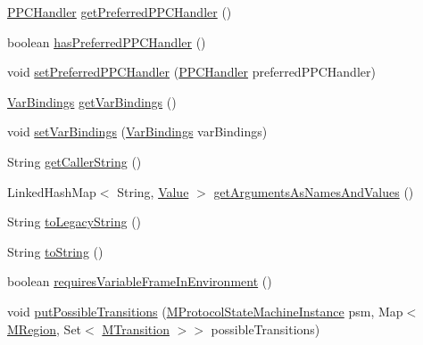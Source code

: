 \begin{DoxyCompactItemize}
\item 
\hyperlink{interfaceorg_1_1tzi_1_1use_1_1uml_1_1sys_1_1ppc_handling_1_1_p_p_c_handler}{P\-P\-C\-Handler} \hyperlink{classorg_1_1tzi_1_1use_1_1uml_1_1sys_1_1_m_operation_call_acb00ad9f70bfbcaa434fc0ba7a3dc27b}{get\-Preferred\-P\-P\-C\-Handler} ()
\item 
boolean \hyperlink{classorg_1_1tzi_1_1use_1_1uml_1_1sys_1_1_m_operation_call_a9b5efe685946efb65226b47e97217d19}{has\-Preferred\-P\-P\-C\-Handler} ()
\item 
void \hyperlink{classorg_1_1tzi_1_1use_1_1uml_1_1sys_1_1_m_operation_call_aa17641a226befd554b35fb9954f46e6d}{set\-Preferred\-P\-P\-C\-Handler} (\hyperlink{interfaceorg_1_1tzi_1_1use_1_1uml_1_1sys_1_1ppc_handling_1_1_p_p_c_handler}{P\-P\-C\-Handler} preferred\-P\-P\-C\-Handler)
\item 
\hyperlink{classorg_1_1tzi_1_1use_1_1uml_1_1ocl_1_1value_1_1_var_bindings}{Var\-Bindings} \hyperlink{classorg_1_1tzi_1_1use_1_1uml_1_1sys_1_1_m_operation_call_a4a476bcb72e8eb4edb392d00eeb30894}{get\-Var\-Bindings} ()
\item 
void \hyperlink{classorg_1_1tzi_1_1use_1_1uml_1_1sys_1_1_m_operation_call_aa7c73345378ff6b84b7cbd7b1a4463ee}{set\-Var\-Bindings} (\hyperlink{classorg_1_1tzi_1_1use_1_1uml_1_1ocl_1_1value_1_1_var_bindings}{Var\-Bindings} var\-Bindings)
\item 
String \hyperlink{classorg_1_1tzi_1_1use_1_1uml_1_1sys_1_1_m_operation_call_af242c567f51c67fc90e03135195b2ec8}{get\-Caller\-String} ()
\item 
Linked\-Hash\-Map$<$ String, \hyperlink{classorg_1_1tzi_1_1use_1_1uml_1_1ocl_1_1value_1_1_value}{Value} $>$ \hyperlink{classorg_1_1tzi_1_1use_1_1uml_1_1sys_1_1_m_operation_call_a762fabe38944988dbb77d1fc52ecba11}{get\-Arguments\-As\-Names\-And\-Values} ()
\item 
String \hyperlink{classorg_1_1tzi_1_1use_1_1uml_1_1sys_1_1_m_operation_call_a53444115bee129e300bea022423c1550}{to\-Legacy\-String} ()
\item 
String \hyperlink{classorg_1_1tzi_1_1use_1_1uml_1_1sys_1_1_m_operation_call_a886568ee3bc7ce5ffd26d778b9bd5db1}{to\-String} ()
\item 
boolean \hyperlink{classorg_1_1tzi_1_1use_1_1uml_1_1sys_1_1_m_operation_call_a87afda00d935c1c491c987b105097a0f}{requires\-Variable\-Frame\-In\-Environment} ()
\item 
void \hyperlink{classorg_1_1tzi_1_1use_1_1uml_1_1sys_1_1_m_operation_call_af09a9c347c2c51d5a88cf222c277da92}{put\-Possible\-Transitions} (\hyperlink{classorg_1_1tzi_1_1use_1_1uml_1_1sys_1_1statemachines_1_1_m_protocol_state_machine_instance}{M\-Protocol\-State\-Machine\-Instance} psm, Map$<$ \hyperlink{classorg_1_1tzi_1_1use_1_1uml_1_1mm_1_1statemachines_1_1_m_region}{M\-Region}, Set$<$ \hyperlink{classorg_1_1tzi_1_1use_1_1uml_1_1mm_1_1statemachines_1_1_m_transition}{M\-Transition} $>$$>$ possible\-Transitions)
$$
\end{DoxyCompactItemize}
